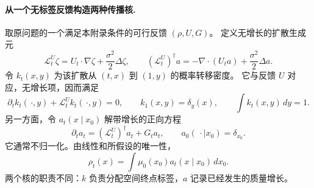 \documentclass[UTF8,a4paper,11pt,fontset=fandol]{ctexart}
\begin{document}
\paragraph{从一个无标签反馈构造两种传播核.}
取原问题的一个满足本附录条件的可行反馈 $(\rho,U,G)$。
定义无增长的扩散生成元
\begin{equation}
\mathcal L_t^U\zeta
=U_t\cdot\nabla\zeta+\frac{\sigma^2}{2}\Delta\zeta,
\qquad
(\mathcal L_t^U)^\dagger a
=-\nabla\cdot(U_ta)+\frac{\sigma^2}{2}\Delta a.
\end{equation}
令 $k_t(x,y)$ 为该扩散从 $(t,x)$ 到 $(1,y)$ 的概率转移密度。
它与反馈 $U$ 对应，无增长项，因而满足
\begin{equation}
\partial_t k_t(\,\cdot,y)+\mathcal L_t^Uk_t(\,\cdot,y)=0,
\qquad k_1(x,y)=\delta_y(x),\qquad
\int k_t(x,y)\,dy=1.
\label{eq:conservative-terminal-kernel}
\end{equation}
另一方面，令 $a_t(x\mid x_0)$ 解带增长的正向方程
\begin{equation}
\partial_ta_t
=(\mathcal L_t^U)^\dagger a_t+G_ta_t,
\qquad a_0(\,\cdot\mid x_0)=\delta_{x_0}.
\label{eq:reactive-source-kernel}
\end{equation}
它通常不归一化。由线性和所假设的唯一性，
\begin{equation}
\rho_t(x)=\int\mu_0(x_0)a_t(x\mid x_0)\,dx_0.
\label{eq:source-disintegration}
\end{equation}
两个核的职责不同：$k$ 负责分配空间终点标签，$a$ 记录已经发生的质量增长。
\end{document}
